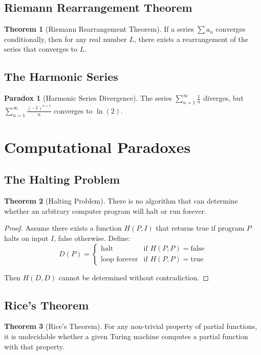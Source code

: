 \documentclass[11pt]{article}
\theoremstyle{definition}
\newtheorem{theorem}{Theorem}[section]
\newtheorem{paradox}{Paradox}[section]
\begin{document}
\subsection{Riemann Rearrangement Theorem}
\begin{theorem}[Riemann Rearrangement Theorem]
If a series $\sum a_n$ converges conditionally, then for any real number $L$, there exists a rearrangement of the series that converges to $L$.
\end{theorem}

\subsection{The Harmonic Series}
\begin{paradox}[Harmonic Series Divergence]
The series $\sum_{n=1}^{\infty} \frac{1}{n}$ diverges, but $\sum_{n=1}^{\infty} \frac{(-1)^{n+1}}{n}$ converges to $\ln(2)$.
\end{paradox}

\section{Computational Paradoxes}

\subsection{The Halting Problem}
\begin{theorem}[Halting Problem]
There is no algorithm that can determine whether an arbitrary computer program will halt or run forever.
\end{theorem}

\begin{proof}
Assume there exists a function $H(P, I)$ that returns true if program $P$ halts on input $I$, false otherwise. Define:
$$D(P) = \begin{cases}
\text{halt} & \text{if } H(P, P) = \text{false} \\
\text{loop forever} & \text{if } H(P, P) = \text{true}
\end{cases}$$

Then $H(D, D)$ cannot be determined without contradiction.
\end{proof}

\subsection{Rice's Theorem}
\begin{theorem}[Rice's Theorem]
For any non-trivial property of partial functions, it is undecidable whether a given Turing machine computes a partial function with that property.
\end{theorem}
\end{document}
